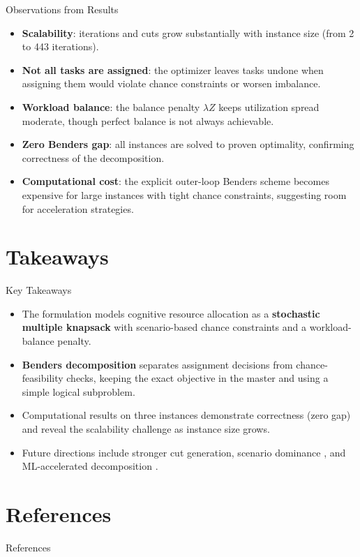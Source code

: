 \documentclass[aspectratio=169,11pt]{beamer}
\begin{document}
\begin{frame}{Observations from Results}
	\begin{itemize}
		\item<1-> \textbf{Scalability}: iterations and cuts grow substantially
			with instance size (from 2 to 443 iterations).
		\item<2-> \textbf{Not all tasks are assigned}: the optimizer leaves
			tasks undone when assigning them would violate chance constraints
			or worsen imbalance.
		\item<3-> \textbf{Workload balance}: the balance penalty $\lambda Z$
			keeps utilization spread moderate, though perfect balance is
			not always achievable.
		\item<4-> \textbf{Zero Benders gap}: all instances are solved to
			proven optimality, confirming correctness of the decomposition.
		\item<5-> \textbf{Computational cost}: the explicit outer-loop
			Benders scheme becomes expensive for large instances with
			tight chance constraints, suggesting room for acceleration
			strategies.
	\end{itemize}
\end{frame}

\section{Takeaways}

\begin{frame}{Key Takeaways}
	\begin{itemize}
		\item<1-> The formulation models cognitive resource allocation as a
			\textbf{stochastic multiple knapsack} with scenario-based chance
			constraints and a workload-balance penalty.
		\item<2-> \textbf{Benders decomposition} separates assignment decisions
			from chance-feasibility checks, keeping the exact objective in
			the master and using a simple logical subproblem.
		\item<3-> Computational results on three instances demonstrate
			correctness (zero gap) and reveal the scalability challenge
			as instance size grows.
		\item<4-> Future directions include stronger cut generation,
			scenario dominance \citep{büyüktahtakın_scenario_2023},
			and ML-accelerated decomposition \citep{larsen_fast_2024}.
	\end{itemize}
\end{frame}

\section{References}

\begin{frame}[allowframebreaks]{References}
	
	
\end{frame}
\end{document}
